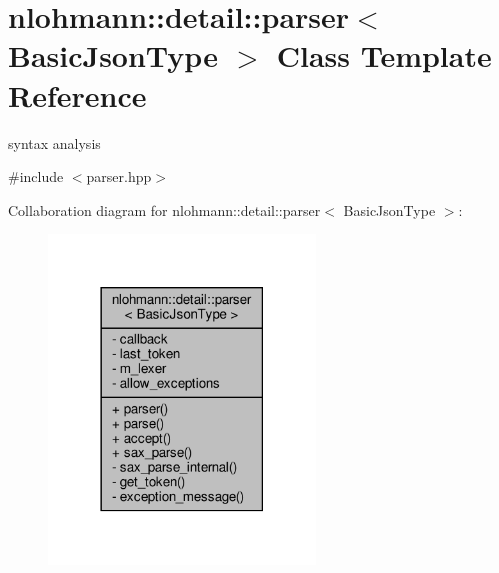 \hypertarget{classnlohmann_1_1detail_1_1parser}{}\section{nlohmann\+:\+:detail\+:\+:parser$<$ Basic\+Json\+Type $>$ Class Template Reference}
\label{classnlohmann_1_1detail_1_1parser}


syntax analysis  




{\ttfamily \#include $<$parser.\+hpp$>$}



Collaboration diagram for nlohmann\+:\+:detail\+:\+:parser$<$ Basic\+Json\+Type $>$\+:
\nopagebreak
\begin{figure}[H]
\begin{center}
\leavevmode
\includegraphics[width=201pt]{classnlohmann_1_1detail_1_1parser__coll__graph}
\end{center}
\end{figure}
